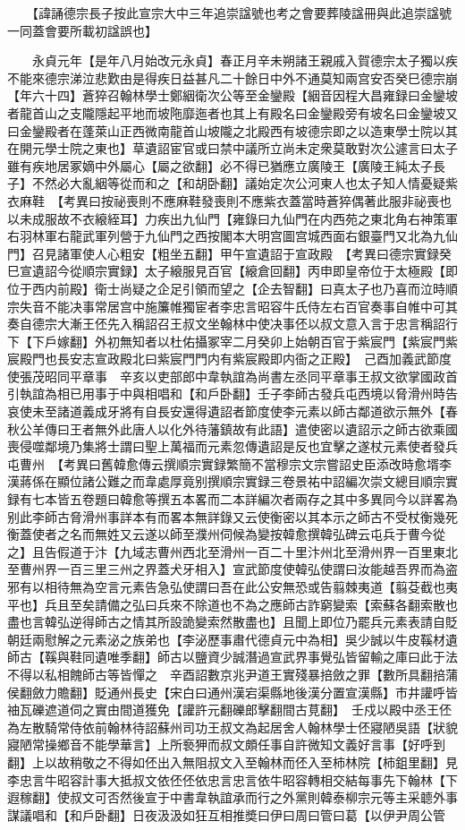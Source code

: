 　　【諱誦德宗長子按此宣宗大中三年追崇諡號也考之會要葬陵諡冊與此追崇諡號一同蓋會要所載初諡誤也】

　　永貞元年【是年八月始改元永貞】春正月辛未朔諸王親戚入賀德宗太子獨以疾不能來德宗涕泣悲歎由是得疾日益甚凡二十餘日中外不通莫知兩宫安否癸巳德宗崩【年六十四】蒼猝召翰林學士鄭絪衛次公等至金鑾殿【絪音因程大昌雍録曰金鑾坡者龍首山之支隴隱起平地而坡陁靡迤者也其上有殿名曰金鑾殿旁有坡名曰金鑾坡又曰金鑾殿者在蓬萊山正西微南龍首山坡隴之北殿西有坡德宗即之以造東學士院以其在開元學士院之東也】草遺詔宦官或曰禁中議所立尚未定衆莫敢對次公遽言曰太子雖有疾地居冢嫡中外屬心【屬之欲翻】必不得已猶應立廣陵王【廣陵王純太子長子】不然必大亂絪等從而和之【和胡卧翻】議始定次公河東人也太子知人情憂疑紫衣麻鞋　【考異曰按祕喪則不應麻鞋發喪則不應紫衣蓋當時蒼猝偶著此服非祕喪也以未成服故不衣縗絰耳】力疾出九仙門【雍錄曰九仙門在内西苑之東北角右神策軍右羽林軍右龍武軍列營于九仙門之西按閣本大明宫圖宫城西面右銀臺門又北為九仙門】召見諸軍使人心粗安【粗坐五翻】甲午宣遺詔于宣政殿　【考異曰德宗實録癸巳宣遺詔今從順宗實録】太子縗服見百官【縗倉回翻】丙申即皇帝位于太極殿【即位于西内前殿】衛士尚疑之企足引領而望之【企去智翻】曰真太子也乃喜而泣時順宗失音不能决事常居宫中施簾帷獨宦者李忠言昭容牛氏侍左右百官奏事自帷中可其奏自德宗大漸王伾先入稱詔召王叔文坐翰林中使决事伾以叔文意入言于忠言稱詔行下【下戶嫁翻】外初無知者以杜佑攝冢宰二月癸卯上始朝百官于紫宸門【紫宸門紫宸殿門也長安志宣政殿北曰紫宸門門内有紫宸殿即内衙之正殿】　己酉加義武節度使張茂昭同平章事　辛亥以吏部郎中韋執誼為尚書左丞同平章事王叔文欲掌國政首引執誼為相已用事于中與相唱和【和戶卧翻】壬子李師古發兵屯西境以脅滑州時告哀使未至諸道義成牙將有自長安還得遺詔者節度使李元素以師古鄰道欲示無外【春秋公羊傳曰王者無外此唐人以化外待藩鎮故有此語】遣使密以遺詔示之師古欲乘國喪侵噬鄰境乃集將士謂曰聖上萬福而元素忽傳遺詔是反也宜擊之遂杖元素使者發兵屯曹州　【考異曰舊韓愈傳云撰順宗實録繁簡不當穆宗文宗嘗詔史臣添改時愈壻李漢蔣係在顯位諸公難之而韋處厚竟别撰順宗實録三卷景祐中詔編次崇文總目順宗實録有七本皆五卷題曰韓愈等撰五本畧而二本詳編次者兩存之其中多異同今以詳畧為别此李師古脅滑州事詳本有而畧本無詳錄又云使衡密以其本示之師古不受杖衡幾死衡蓋使者之名而無姓又云遂以師至濮州伺候為變按韓愈撰韓弘碑云屯兵于曹今從之】且告假道于汴【九域志曹州西北至滑州一百二十里汴州北至滑州界一百里東北至曹州界一百三里三州之界蓋犬牙相入】宣武節度使韓弘使謂曰汝能越吾界而為盗邪有以相待無為空言元素告急弘使謂曰吾在此公安無恐或告翦棘夷道【翦芟截也夷平也】兵且至矣請備之弘曰兵來不除道也不為之應師古詐窮變索【索蘇各翻索散也盡也言韓弘逆得師古之情其所設詭變索然散盡也】且聞上即位乃罷兵元素表請自貶朝廷兩慰解之元素泌之族弟也【李泌歷事肅代德貞元中為相】吳少誠以牛皮鞵材遺師古【鞵與鞋同遺唯季翻】師古以鹽資少誠潛過宣武界事覺弘皆留輸之庫曰此于法不得以私相餽師古等皆憚之　辛酉詔數京兆尹道王實殘暴掊斂之罪【數所具翻掊蒲侯翻斂力贍翻】貶通州長史【宋白曰通州漢宕渠縣地後漢分置宣漢縣】市井讙呼皆䄂瓦礫遮道伺之實由間道獲免【讙許元翻礫郎擊翻間古莧翻】　壬戍以殿中丞王伾為左散騎常侍依前翰林待詔蘇州司功王叔文為起居舍人翰林學士伾寢陋吳語【狀貌寢陋常操鄉音不能學華言】上所䙝狎而叔文頗任事自許微知文義好言事【好呼到翻】上以故稍敬之不得如伾出入無阻叔文入至翰林而伾入至柿林院【柿鉏里翻】見李忠言牛昭容計事大抵叔文依伾伾依忠言忠言依牛昭容轉相交結每事先下翰林【下遐稼翻】使叔文可否然後宣于中書韋執誼承而行之外黨則韓泰柳宗元等主采聼外事謀議唱和【和戶卧翻】日夜汲汲如狂互相推奬曰伊曰周曰管曰葛【以伊尹周公管